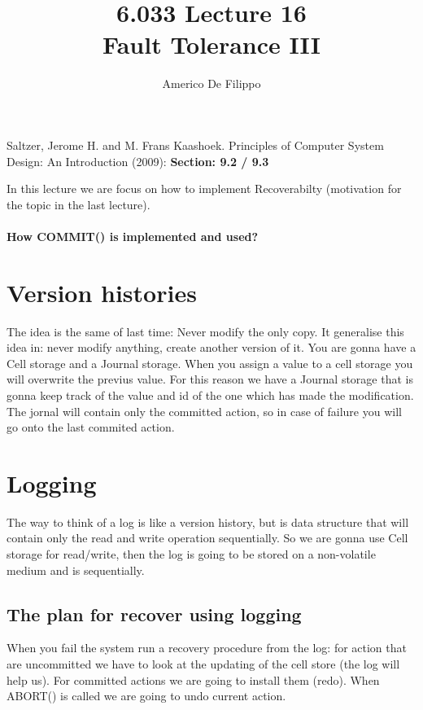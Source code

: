 \documentclass{article}
\title{6.033 Lecture 16 \\ Fault Tolerance III}
\author{Americo De Filippo}
\begin{document}
 
  \maketitle
  \begin{thebibliography}{9}
    Saltzer, Jerome H. and M. Frans Kaashoek. Principles of Computer System Design: An Introduction (2009): \textbf{Section: 9.2 / 9.3}
  \end{thebibliography}
  \maketitle
  In this lecture we are focus on how to implement Recoverabilty (motivation for the topic in
  the last lecture).
  \paragraph{How COMMIT() is implemented and used?}
  \section{Version histories}
    The idea is the same of last time: Never modify the only copy. It generalise this idea
    in: never modify anything, create another version of it. You are gonna have a Cell storage
    and a Journal storage. When you assign a value to a cell storage you will overwrite the
    previus value. For this reason we have a Journal storage that is gonna keep track of the
    value and id of the one which has made the modification. The jornal will contain only
    the committed action, so in case of failure you will go onto the last commited action.
  \section{Logging}
    The way to think of a log is like a version history, but is data structure that will 
    contain only the read and write operation sequentially. So we are gonna use Cell storage
    for read/write, then the log is going to be stored on a non-volatile medium and is 
    sequentially.
  \subsection{The plan for recover using logging}
    When you fail the system run a recovery procedure from the log: for action that are 
    uncommitted we have to look at the updating of the cell store (the log will help us).
    For committed actions we are going to install them (redo). When ABORT() is called
    we are going to undo current action.
\end{document}
